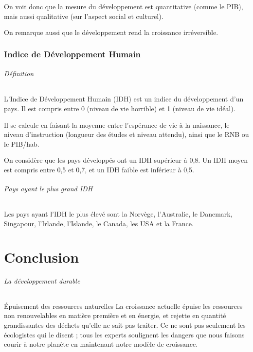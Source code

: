 \documentclass[10pt,a4paper,french]{article}
\begin{document}
On voit donc que la mesure du développement est quantitative (comme le PIB), mais aussi qualitative (sur l’aspect social et culturel).

On remarque aussi que le développement rend la croissance irréversible.

\section{Indice de Développement Humain}

\paragraph{Définition}

L’Indice de Développement Humain (IDH) est un indice du développement d’un pays. Il est compris entre 0 (niveau de vie horrible) et 1 (niveau de vie idéal).

Il se calcule en faisant la moyenne entre l’espérance de vie à la naissance, le niveau d’instruction (longueur des études et niveau attendu), ainsi que le RNB ou le PIB/hab.

On considère que les pays développés ont un IDH supérieur à 0,8. Un IDH moyen est compris entre 0,5 et 0,7, et un IDH faible est inférieur à 0,5.

\paragraph{Pays ayant le plus grand IDH}

Les pays ayant l’IDH le plus élevé sont la Norvège, l’Australie, le Danemark, Singapour, l’Irlande,
l’Islande, le Canada, les USA et la France.

\part{Conclusion}

\paragraph{La développement durable}

Épuisement des ressources naturelles
La croissance actuelle épuise les ressources non renouvelables en matière première et en énergie, et
rejette en quantité grandissantes des déchets qu’elle ne sait pas traiter. Ce ne sont pas seulement les
écologistes qui le disent ; tous les experts soulignent les dangers que nous faisons courir à notre planète en
maintenant notre modèle de croissance.
\end{document}
